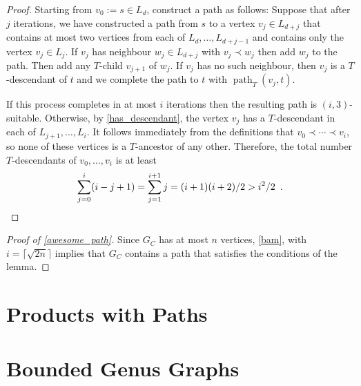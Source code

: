 \documentclass{patmorin}
\DeclareMathOperator{\pth}{path}
\begin{document}
\begin{proof}
  Starting from $v_0:=s\in L_d$, construct a path as follows:  Suppose that after $j$ iterations, we have constructed a path from $s$ to a vertex $v_j\in L_{d+j}$ that contains at most two vertices from each of $L_d,\ldots,L_{d+j-1}$ and contains only the vertex $v_j\in L_j$.  If $v_j$ has neighbour $w_j\in L_{d+j}$ with $v_j\prec w_j$ then add $w_j$ to the path.  Then add any $T$-child $v_{j+1}$ of $w_j$.  If $v_j$ has no such neighbour, then $v_j$ is a $T$-descendant of $t$ and we complete the path to $t$ with $\pth_T(v_j,t)$.

  If this process completes in at most $i$ iterations then the resulting path is $(i,3)$-suitable.  Otherwise, by \cref{has_descendant}, the vertex $v_j$ has a $T$-descendant in each of $L_{j+1},\ldots,L_i$. It follows immediately from the definitions that $v_0\prec\cdots\prec v_i$, so none of these vertices is a $T$-ancestor of any other.  Therefore, the total number $T$-descendants of $v_0,\ldots,v_i$ is at least
  \[
    \sum_{j=0}^i (i-j+1) = \sum_{j=1}^{i+1} j = (i+1)(i+2)/2 > i^2/2 \enspace .
    \qedhere
  \]
\end{proof}

\begin{proof}[Proof of \cref{awesome_path}]
  Since $G_C$ has at most $n$ vertices, \cref{bam}, with $i=\lceil \sqrt{2n}\rceil$ implies that $G_C$ contains a path that satisfies the conditions of the lemma.
\end{proof}

\section{Products with Paths}

\section{Bounded Genus Graphs}




\end{document}
